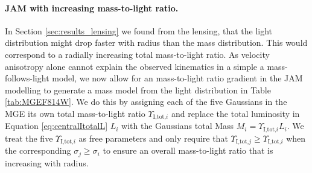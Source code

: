 \paragraph{JAM with increasing mass-to-light ratio.} In Section \ref{sec:results_lensing} we found from the lensing, that the light distribution might drop faster with radius than the mass distribution. This would correspond to a radially increasing total mass-to-light ratio. As velocity anisotropy alone cannot explain the observed kinematics in a simple a mass-follows-light model, we now allow for an mass-to-light ratio gradient in the JAM modelling to generate a mass model from the light distribution in Table \ref{tab:MGEF814W}. We do this by assigning each of the five Gaussians in the MGE its own total mass-to-light ratio $\Upsilon_{\text{I,tot,}i}$ and replace the total luminosity in Equation \eqref{eq:centralItotalL} $L_i$ with the Gaussians total Mass $M_i = \Upsilon_{\text{I,tot,}i} L_i$. We treat the five $\Upsilon_{\text{I,tot,}i}$ as free parameters and only require that $\Upsilon_{\text{I,tot,}j} \geq \Upsilon_{\text{I,tot,}i}$ when the corresponding $\sigma_j \geq \sigma_i$ to ensure an overall mass-to-light ratio that is increasing with radius.


